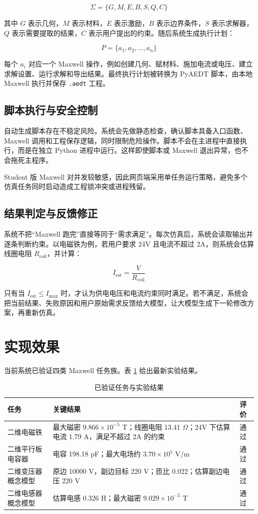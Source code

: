 \documentclass[11pt,a4paper]{ctexart}
\begin{document}
\[
\Sigma = \{G, M, E, B, S, Q, C\}
\]

其中 $G$ 表示几何，$M$ 表示材料，$E$ 表示激励，$B$ 表示边界条件，$S$ 表示求解器，$Q$ 表示需要提取的结果，$C$ 表示用户提出的约束。随后系统生成执行计划：

\[
P = \{a_1, a_2, \ldots, a_n\}
\]

每个 $a_i$ 对应一个 Maxwell 操作，例如创建几何、赋材料、施加电流或电压、建立求解设置、运行求解和导出结果。最终执行计划被转换为 PyAEDT 脚本，由本地 Maxwell 执行并保存 \texttt{.aedt} 工程。

\subsection{脚本执行与安全控制}

自动生成脚本存在不稳定风险。系统会先做静态检查，确认脚本具备入口函数、Maxwell 调用和工程保存逻辑，同时限制危险操作。脚本不会在主进程中直接执行，而是在独立 Python 进程中运行。这样即使脚本或 Maxwell 退出异常，也不会拖死主程序。

Student 版 Maxwell 对并发较敏感，因此网页端采用单任务运行策略，避免多个仿真任务同时启动造成工程锁冲突或进程残留。

\subsection{结果判定与反馈修正}

系统不把“Maxwell 跑完”直接等同于“需求满足”。每次仿真后，系统会读取输出并逐条判断约束。以电磁铁为例，若用户要求 24V 且电流不超过 2A，则系统会估算线圈电阻 $R_{\mathrm{coil}}$，并计算：

\[
I_{\mathrm{est}} = \frac{V}{R_{\mathrm{coil}}}
\]

只有当 $I_{\mathrm{est}} \leq I_{\max}$ 时，才认为供电电压和电流约束同时满足。若不满足，系统会把当前结果、失败原因和用户原始需求反馈给大模型，让大模型生成下一轮修改方案，再重新仿真。

\section{实现效果}

当前系统已验证四类 Maxwell 任务族。表 \ref{tab:results} 给出最新实验结果。

\begin{table}[h]
\centering
\caption{已验证任务与实验结果}
\label{tab:results}
\begin{tabularx}{\textwidth}{>{\raggedright\arraybackslash}p{3.0cm}X>{\centering\arraybackslash}p{1.5cm}}
\toprule
任务 & 关键结果 & 评价 \\
\midrule
二维电磁铁 & 最大磁密 $9.866\times10^{-5}$ T；线圈电阻 13.41 $\Omega$；24V 下估算电流 1.79 A，满足不超过 2A 的约束 & 通过 \\
二维平行板电容器 & 电容 198.18 pF；最大电场约 $3.70\times10^{5}$ V/m & 通过 \\
二维变压器概念模型 & 原边 10000 V，副边目标 220 V；匝比 0.022；估算副边电压 220 V & 通过 \\
二维电感器概念模型 & 估算电感 0.326 H；最大磁密 $9.029\times10^{-5}$ T & 通过 \\
\bottomrule
\end{tabularx}
\end{table}
\end{document}
